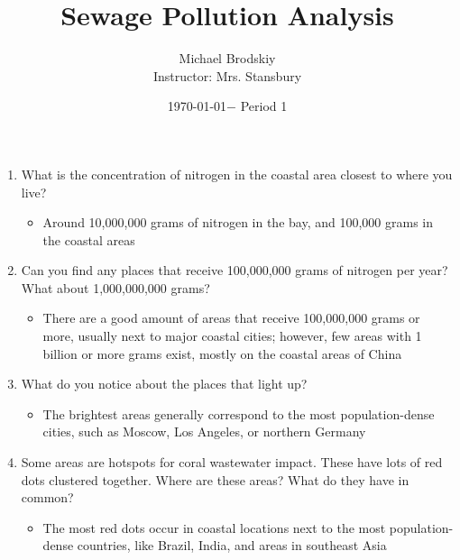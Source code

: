 \documentclass[12pt]{article}
\title{Sewage Pollution Analysis}
\date{\today $-$ Period 1}
\author{Michael Brodskiy\\ \small Instructor: Mrs. Stansbury}
\begin{document}
\maketitle

\begin{enumerate}

  \item What is the concentration of nitrogen in the coastal area closest to where you live?

    \begin{itemize}

      \item Around 10,000,000 grams of nitrogen in the bay, and 100,000 grams in the coastal areas

    \end{itemize}

  \item Can you find any places that receive 100,000,000 grams of nitrogen per year? What about 1,000,000,000 grams?

    \begin{itemize}

      \item There are a good amount of  areas that receive 100,000,000 grams or more, usually next to major coastal cities; however, few areas with 1 billion or more grams exist, mostly on the coastal areas of China

    \end{itemize}

  \item What do you notice about the places that light up?

    \begin{itemize}

      \item The brightest areas generally correspond to the most population-dense cities, such as Moscow, Los Angeles, or northern Germany

    \end{itemize}

  \item Some areas are hotspots for coral wastewater impact. These have lots of red dots clustered together. Where are these areas? What do they have in common?

    \begin{itemize}

      \item The most red dots occur in coastal locations next to the most population-dense countries, like Brazil, India, and areas in southeast Asia


\end{itemize}
\end{enumerate}
\end{document}
